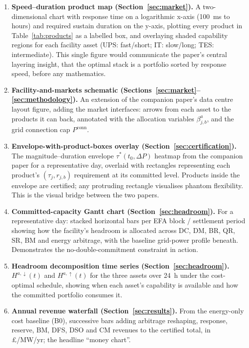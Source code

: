 \documentclass[lettersize,journal]{IEEEtran}
\begin{document}
\begin{enumerate}
    \item \textbf{Speed--duration product map (Section~\ref{sec:market}).} A two-dimensional chart with response time on a logarithmic x-axis (100~ms to hours) and required sustain duration on the y-axis, plotting every product in Table~\ref{tab:products} as a labelled box, and overlaying shaded capability regions for each facility asset (UPS: fast/short; IT: slow/long; TES: intermediate). This single figure would communicate the paper's central layering insight, that the optimal stack is a portfolio sorted by response speed, before any mathematics.
    \item \textbf{Facility-and-markets schematic (Sections~\ref{sec:market}--\ref{sec:methodology}).} An extension of the companion paper's data centre layout figure, adding the market interfaces: arrows from each asset to the products it can back, annotated with the allocation variables $\beta^{a}_{j,b}$, and the grid connection cap $P^{\mathrm{conn}}$.
    \item \textbf{Envelope-with-product-boxes overlay (Section~\ref{sec:certification}).} The magnitude--duration envelope $\tau^{*}(t_0, \Delta P)$ heatmap from the companion paper for a representative day, overlaid with rectangles representing each product's $(\tau_j, r_{j,b})$ requirement at its committed level. Products inside the envelope are certified; any protruding rectangle visualises phantom flexibility. This is the visual bridge between the two papers.
    \item \textbf{Committed-capacity Gantt chart (Section~\ref{sec:headroom}).} For a representative day: stacked horizontal bars per EFA block / settlement period showing how the facility's headroom is allocated across DC, DM, BR, QR, SR, BM and energy arbitrage, with the baseline grid-power profile beneath. Demonstrates the no-double-commitment constraint in action.
    \item \textbf{Headroom decomposition time series (Section~\ref{sec:headroom}).} $H^{a,\downarrow}(t)$ and $H^{a,\uparrow}(t)$ for the three assets over 24~h under the cost-optimal schedule, showing when each asset's capability is available and how the committed portfolio consumes it.
    \item \textbf{Annual revenue waterfall (Section~\ref{sec:results}).} From the energy-only cost baseline (B0), successive bars adding arbitrage reshaping, response, reserve, BM, DFS, DSO and CM revenues to the certified total, in \pounds/MW/yr; the headline ``money chart''.

\end{enumerate}
\end{document}

